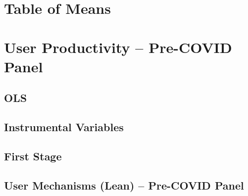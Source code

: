 \documentclass{article}
\newcommand{\cleanedresultsdir}{../results/cleaned}
\begin{document}
\begingroup
  \let\clearpage\relax
  \tableofcontents
\endgroup

\section{Table of Means}


\section{User Productivity – Pre-COVID Panel}

\subsection{OLS}


\subsection{Instrumental Variables}


\subsection{First Stage}


\clearpage
\begin{landscape}
\section{User Mechanisms (Lean) – Pre-COVID Panel}

\end{landscape}
\end{document}

